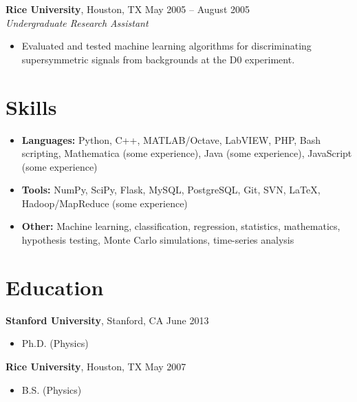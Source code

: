 \documentclass[margin,line]{resume}
\begin{document}
\begin{resume}
    \textbf{Rice University}, Houston, TX \hfill May 2005 -- August 2005 \vspace{1mm}\\\vspace{1mm}%
    \textsl{Undergraduate Research Assistant}
    \begin{itemize}
    \item Evaluated and tested machine learning algorithms for discriminating supersymmetric signals from backgrounds at the D0 experiment.
    \end{itemize}
    
    \section{\mysidestyle Skills}\vspace{0mm}%
    \begin{itemize}
    \item \textbf{Languages:} Python, C++, MATLAB/Octave, LabVIEW, PHP, Bash scripting, Mathematica (some experience), Java (some experience), JavaScript (some experience)
    \item \textbf{Tools:} NumPy, SciPy, Flask, MySQL, PostgreSQL, Git, SVN, \LaTeX, Hadoop/MapReduce (some experience)
    \item \textbf{Other:} Machine learning, classification, regression, statistics, mathematics, hypothesis testing, Monte Carlo simulations, time-series analysis
    \end{itemize}
    
    \section{\mysidestyle Education}

    \textbf{Stanford University}, Stanford, CA \hfill June 2013\vspace{-3mm}\\\vspace{-1mm}%
    \begin{itemize}
    \item Ph.D. (Physics)
    \end{itemize}\vspace{-1.5mm}
    
    \textbf{Rice University}, Houston, TX \hfill May 2007\vspace{-3mm}\\\vspace{-1mm}%
    \begin{itemize}
    \item B.S. (Physics)
    \end{itemize}\vspace{-1.5mm}
 

\end{resume}
\end{document}
